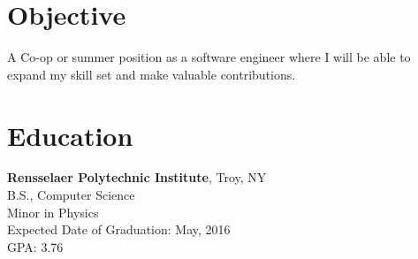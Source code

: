 \documentclass[margin]{res}
\begin{document}
 
\begin{minipage}{\textwidth}
 
 
\address{{\bf Present Address} \\ Blitman Commons, Room 2310 \\ 1999 Burdett Avenue \\ Troy, NY 12180 \\
        (207) 632-0713 }
\address{{\bf Permanent Address} \\ 4 Oak Street \\ Cumberland, ME 04021 \\
        (207) 632-0713 }
\begin{resume} 
 
\section{Objective} 
A Co-op or summer position as a software engineer where I will be able to expand my skill set and make valuable contributions. %

\section{Education} 
{\bf Rensselaer Polytechnic Institute}, Troy, NY \\
B.S., Computer Science \\
Minor in Physics \\
Expected Date of Graduation: May, 2016 \\
GPA: 3.76
 


\end{resume}
\end{minipage}
\end{document}
